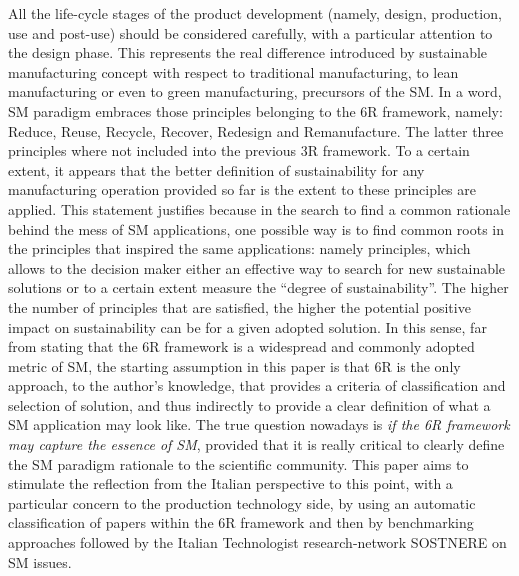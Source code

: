 \documentclass[]{book}
\begin{document}
All the life-cycle stages of the product development (namely, design,
production, use and post-use) should be considered carefully, with a
particular attention to the design phase. This represents the real
difference introduced by sustainable manufacturing concept with respect
to traditional manufacturing, to lean manufacturing or even to green
manufacturing, precursors of the SM. In a word, SM paradigm embraces
those principles belonging to the 6R framework, namely: Reduce, Reuse,
Recycle, Recover, Redesign and Remanufacture. The latter three
principles where not included into the previous 3R framework. To a
certain extent, it appears that the better definition of sustainability
for any manufacturing operation provided so far is the extent to these
principles are applied. This statement justifies because in the search
to find a common rationale behind the mess of SM applications, one
possible way is to find common roots in the principles that inspired the
same applications: namely principles, which allows to the decision maker
either an effective way to search for new sustainable solutions or to a
certain extent measure the ``degree of sustainability''. The higher the
number of principles that are satisfied, the higher the potential
positive impact on sustainability can be for a given adopted solution.
In this sense, far from stating that the 6R framework is a widespread
and commonly adopted metric of SM, the starting assumption in this paper
is that 6R is the only approach, to the author's knowledge, that
provides a criteria of classification and selection of solution, and
thus indirectly to provide a clear definition of what a SM application
may look like. The true question nowadays is \emph{if the 6R framework
may capture the essence of SM}, provided that it is really critical to
clearly define the SM paradigm rationale to the scientific community.
This paper aims to stimulate the reflection from the Italian perspective
to this point, with a particular concern to the production technology
side, by using an automatic classification of papers within the 6R
framework and then by benchmarking approaches followed by the Italian
Technologist research-network SOSTNERE on SM issues.
\end{document}
